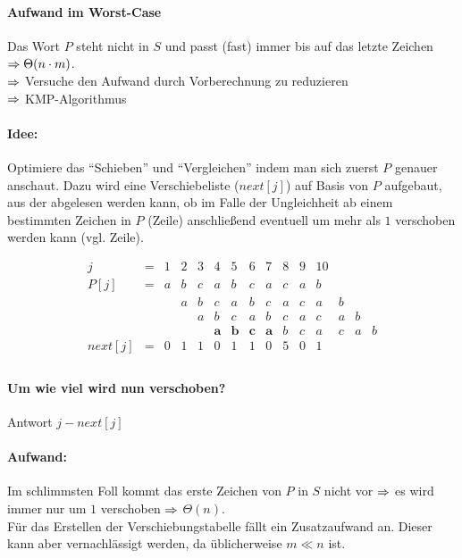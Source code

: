 \documentclass[a4paper]{scrartcl}
\begin{document}
\paragraph{Aufwand im Worst-Case}

Das Wort $P$ steht nicht in $S$ und passt (fast) immer bis auf das letzte Zeichen $\Rightarrow \Theta(n \cdot m)$.\\
$\Rightarrow$ Versuche den Aufwand durch Vorberechnung zu reduzieren\\
$\Rightarrow$ KMP-Algorithmus

\paragraph{Idee:} Optimiere das "`Schieben"' und "`Vergleichen"' indem man sich zuerst $P$ genauer anschaut.
Dazu wird eine Verschiebeliste ($next[j]$) auf Basis von $P$ aufgebaut, aus der abgelesen werden kann, ob im 
Falle der Ungleichheit ab einem bestimmten Zeichen in $P$ (Zeile) anschließend eventuell um mehr als $1$ 
verschoben werden kann (vgl. Zeile).

$$\begin{array}{ccccccccccccccc}
    j  & = & 1 & 2 & 3 & 4 & 5 & 6 & 7 & 8 & 9 & 10 \\
	P[j] & = & a & b & c & a & b & c & a & c & a & b \\
       &   &   & a & b & c & a & b & c & a & c & a & b \\
       &   &   &   & a & b & c & a & b & c & a & c & a & b \\
       &   &   &   &   & \textbf{a} & \textbf{b} & \textbf{c} & \textbf{a} & b & c & a & c & a & b \\
  next[j]& = & 0 & 1 & 1 & 0 & 1 & 1 & 0 & 5 & 0 & 1 \\
\end{array}$$

\paragraph{Um wie viel wird nun verschoben?} Antwort $j - next[j]$

\paragraph{Aufwand:}
	Im schlimmsten Foll kommt das erste Zeichen von $P$ in $S$ nicht vor $\Rightarrow$ es wird immer nur um $1$ verschoben
	$\Rightarrow$ $\Theta(n)$.\\
	Für das Erstellen der Verschiebungstabelle fällt ein Zusatzaufwand an. Dieser kann aber vernachlässigt werden, da
	üblicherweise $m \ll n$ ist.
	
\end{document}
